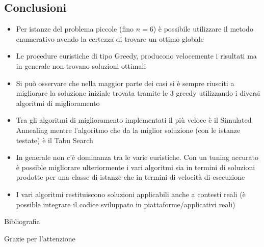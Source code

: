 \documentclass[9pt]{beamer}
\begin{document}
\subsection{Conclusioni}
\begin{frame}{\subsecname}

	\begin{itemize}
		\item
		Per istanze del problema piccole (fino $n = 6$) è possibile utilizzare il metodo enumerativo avendo la certezza di trovare un ottimo globale
		\item
		Le procedure euristiche di tipo Greedy, producono velocemente i risultati ma in generale non trovano soluzioni ottimali
		\item
		Si può osservare che nella maggior parte dei casi si è sempre riusciti a migliorare la soluzione iniziale trovata tramite le 3 greedy utilizzando i diversi algoritmi di miglioramento
		\item
		Tra gli algoritmi di miglioramento implementati il più veloce è il Simulated Annealing mentre l'algoritmo che da la miglior soluzione (con le istanze testate) è il Tabu Search
		\item
		In generale non c’è dominanza tra le varie euristiche. Con un tuning accurato è possible migliorare ulteriormente i vari algoritmi sia in termini di soluzioni prodotte per una classe di istanze che in termini di velocità di esecuzione
		\item
		I vari algoritmi restituiscono soluzioni applicabili anche a contesti reali (è possible integrare il codice sviluppato in piattaforme/applicativi reali)
	\end{itemize}

\end{frame}

\begin{frame}{Bibliografia}

	
	

\end{frame}

\begin{frame}[standout]
Grazie per l'attenzione
\end{frame}
\end{document}
